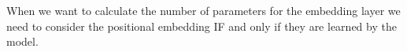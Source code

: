 When we want to calculate the number of parameters for the embedding layer we need to consider the positional embedding IF and only if they are learned by the model.



